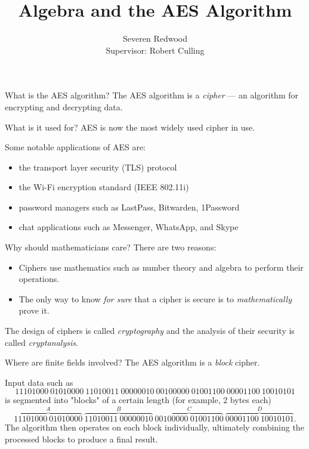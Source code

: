 \documentclass[aspectratio=169]{beamer}
\title{Algebra and the AES Algorithm}
\author{Severen Redwood \\ {\small Supervisor: Robert Culling}}
\institute{University of Canterbury}
\begin{document}
\begin{frame}
  \titlepage
\end{frame}

\begin{frame}{What is the AES algorithm?}
The AES algorithm is a \emph{cipher} --- an algorithm for encrypting and decrypting data.
\end{frame}

\begin{frame}{What is it used for?}
  AES is now the most widely used cipher in use. \pause
  
  Some notable applications of AES are:
  \begin{itemize}[<+->]
    \item the transport layer security (TLS) protocol
    \item the Wi-Fi encryption standard (IEEE 802.11i)
    \item password managers such as LastPass, Bitwarden, 1Password
    \item chat applications such as Messenger, WhatsApp, and Skype
  \end{itemize}
\end{frame}

\begin{frame}{Why should mathematicians care?}
  There are two reasons:
  \begin{itemize}[<+->]
    \item Ciphers use mathematics such as number theory and algebra to perform their
          operations.
    \item The only way to know \emph{for sure} that a cipher is secure is to
          \emph{mathematically} prove it.
  \end{itemize}

  \pause

  The design of ciphers is called \emph{cryptography} and the analysis of their security
  is called \emph{cryptanalysis}.
\end{frame}

\begin{frame}{Where are finite fields involved?}
The AES algorithm is a \emph{block} cipher. \pause

Input data such as
\[ 11101000~01010000~11010011~00000010~00100000~01001100~00001100~10010101 \]
\pause is segmented into "blocks" of a certain length \pause (for example, 2 bytes each)
\[
  \overbrace{11101000~01010000}^A~
  \overbrace{11010011~00000010}^B~
  \overbrace{00100000~01001100}^C~
  \overbrace{00001100~10010101}^D.
\]
\pause The algorithm then operates on each block individually, ultimately combining the
processed blocks to produce a final result.
\end{frame}
\end{document}
